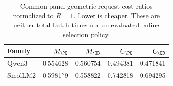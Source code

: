 \begin{table}[htbp]\centering\small
\caption{Common-panel geometric request-cost ratios normalized to $R=1$. Lower is cheaper. These are neither total batch times nor an evaluated online selection policy.}\label{tab:normalizedcosts}
\setlength{\tabcolsep}{3pt}
\begin{tabular}{@{}lrrrr@{}}\toprule
Family & $M_{\PQ}$ & $M_{\QB}$ & $C_{\PQ}$ & $C_{\QB}$\\\midrule
Qwen3 & 0.554628 & 0.560754 & 0.494381 & 0.471841\\
SmolLM2 & 0.598179 & 0.558822 & 0.742818 & 0.694295\\
\bottomrule\end{tabular}
\end{table}
